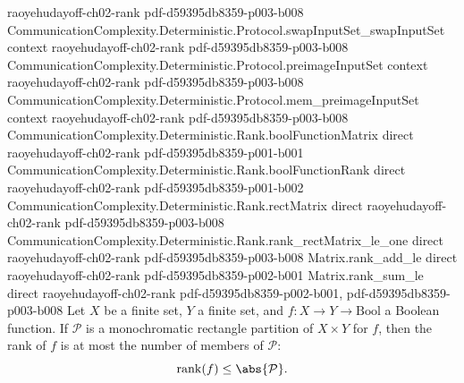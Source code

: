 \begin{theorem}
  {raoyehudayoff-ch02-rank}
  {pdf-d59395db8359-p003-b008}
\proofstep
  {CommunicationComplexity.Deterministic.Protocol.swapInputSet_swapInputSet}
  {context}
  {raoyehudayoff-ch02-rank}
  {pdf-d59395db8359-p003-b008}
\proofstep
  {CommunicationComplexity.Deterministic.Protocol.preimageInputSet}
  {context}
  {raoyehudayoff-ch02-rank}
  {pdf-d59395db8359-p003-b008}
\proofstep
  {CommunicationComplexity.Deterministic.Protocol.mem_preimageInputSet}
  {context}
  {raoyehudayoff-ch02-rank}
  {pdf-d59395db8359-p003-b008}
\proofstep
  {CommunicationComplexity.Deterministic.Rank.boolFunctionMatrix}
  {direct}
  {raoyehudayoff-ch02-rank}
  {pdf-d59395db8359-p001-b001}
\proofstep
  {CommunicationComplexity.Deterministic.Rank.boolFunctionRank}
  {direct}
  {raoyehudayoff-ch02-rank}
  {pdf-d59395db8359-p001-b002}
\proofstep
  {CommunicationComplexity.Deterministic.Rank.rectMatrix}
  {direct}
  {raoyehudayoff-ch02-rank}
  {pdf-d59395db8359-p003-b008}
\proofstep
  {CommunicationComplexity.Deterministic.Rank.rank_rectMatrix_le_one}
  {direct}
  {raoyehudayoff-ch02-rank}
  {pdf-d59395db8359-p003-b008}
\proofstep
  {Matrix.rank_add_le}
  {direct}
  {raoyehudayoff-ch02-rank}
  {pdf-d59395db8359-p002-b001}
\proofstep
  {Matrix.rank_sum_le}
  {direct}
  {raoyehudayoff-ch02-rank}
  {pdf-d59395db8359-p002-b001,
    pdf-d59395db8359-p003-b008}
Let $X$ be a finite set, $Y$ a finite set, and $f : X \to Y \to \mathrm{Bool}$ a Boolean
function. If $\mathcal{P}$ is a monochromatic rectangle partition of $X \times Y$ for
$f$, then the rank of $f$ is at most the number of members of $\mathcal{P}$:
\[
\mathrm{rank}(f) \le \abs{\mathcal{P}}.
\]
\end{theorem}

